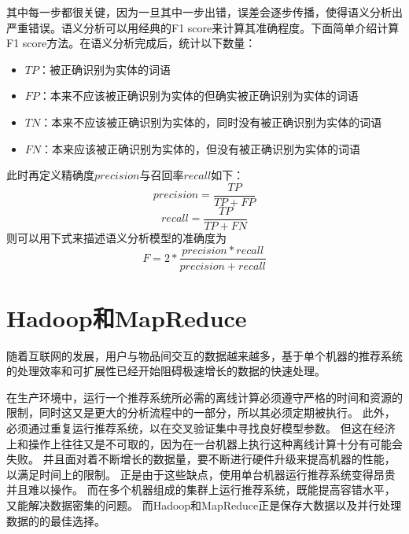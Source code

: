 其中每一步都很关键，因为一旦其中一步出错，误差会逐步传播，使得语义分析出严重错误。语义分析可以用经典的F1 score来计算其准确程度。下面简单介绍计算F1 score方法。在语义分析完成后，统计以下数量：
\begin{center}
\begin{itemize}
	\item $TP$：被正确识别为实体的词语
	\item $FP$：本来不应该被正确识别为实体的但确实被正确识别为实体的词语
	\item $TN$：本来不应该被正确识别为实体的，同时没有被正确识别为实体的词语
	\item $FN$：本来应该被正确识别为实体的，但没有被正确识别为实体的词语
\end{itemize}
\end{center}
此时再定义精确度$precision$与召回率$recall$如下：
\begin{equation}
precision= \frac{TP}{TP+FP}
\end{equation}
\begin{equation}
recall= \frac{TP}{TP+FN}
\end{equation}
则可以用下式来描述语义分析模型的准确度为
\begin{equation}
F= 2* \frac{precision*recall}{precision+recall}
\end{equation}


\section{Hadoop和MapReduce}
随着互联网的发展，用户与物品间交互的数据越来越多，基于单个机器的推荐系统的处理效率和可扩展性已经开始阻碍极速增长的数据的快速处理。

在生产环境中，运行一个推荐系统所必需的离线计算必须遵守严格的时间和资源的限制，同时这又是更大的分析流程中的一部分，所以其必须定期被执行。
此外，必须通过重复运行推荐系统，以在交叉验证集中寻找良好模型参数。
但这在经济上和操作上往往又是不可取的，因为在一台机器上执行这种离线计算十分有可能会失败。
并且面对着不断增长的数据量，要不断进行硬件升级来提高机器的性能，以满足时间上的限制。
正是由于这些缺点，使用单台机器运行推荐系统变得昂贵并且难以操作。
而在多个机器组成的集群上运行推荐系统，既能提高容错水平，又能解决数据密集的问题。
而Hadoop和MapReduce正是保存大数据以及并行处理数据的的最佳选择。

